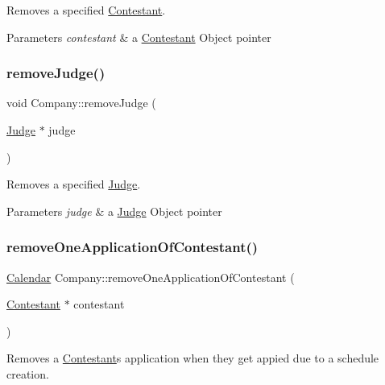 Removes a specified \hyperlink{class_contestant}{Contestant}. 


\begin{DoxyParams}{Parameters}
{\em contestant} & a \hyperlink{class_contestant}{Contestant} Object pointer \\
\hline
\end{DoxyParams}
\mbox{\label{class_company_a39346c8e12c0cdcd47e300089301a6ea}} 
\subsubsection{\texorpdfstring{remove\+Judge()}{removeJudge()}}
{\footnotesize\ttfamily void Company\+::remove\+Judge (\begin{DoxyParamCaption}\item[{\hyperlink{class_judge}{Judge} $\ast$}]{judge }\end{DoxyParamCaption})}



Removes a specified \hyperlink{class_judge}{Judge}. 


\begin{DoxyParams}{Parameters}
{\em judge} & a \hyperlink{class_judge}{Judge} Object pointer \\
\hline
\end{DoxyParams}
\mbox{\label{class_company_a744e01f3f6644035f054ceb6827ddaa9}} 
\subsubsection{\texorpdfstring{remove\+One\+Application\+Of\+Contestant()}{removeOneApplicationOfContestant()}}
{\footnotesize\ttfamily \hyperlink{class_calendar}{Calendar} Company\+::remove\+One\+Application\+Of\+Contestant (\begin{DoxyParamCaption}\item[{\hyperlink{class_contestant}{Contestant} $\ast$}]{contestant }\end{DoxyParamCaption})}



Removes a \hyperlink{class_contestant}{Contestant}\textquotesingle{}s application when they get appied due to a schedule creation. 


